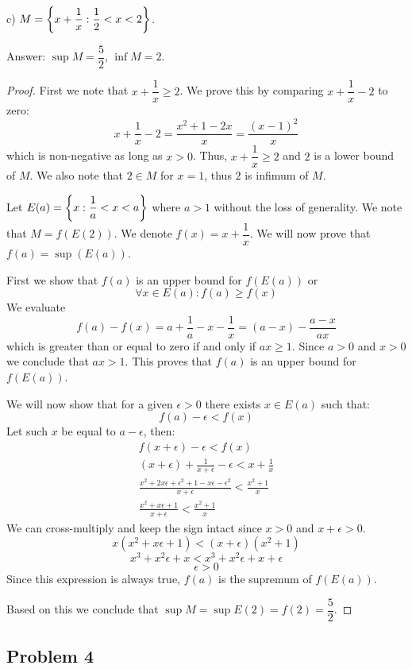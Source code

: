 \documentclass{article}
\DeclarePairedDelimiter{\set}{ \{ }{ \} }
\begin{document}
\begin{tcolorbox}
c) $M = \set*{ x + \dfrac{1}{x} : \dfrac{1}{2} < x < 2 }$.
\end{tcolorbox}

Answer: $\sup M = \dfrac{5}{2}$, $\inf M = 2$.

\begin{proof}
First we note that $x+\dfrac{1}{x} \geq 2$.
We prove this by comparing $x+\dfrac{1}{x}-2$ to zero:
\[ x+\frac{1}{x}-2 = \frac{x^2+1-2x}{x} = \frac{(x-1)^2}{x} \]
which is non-negative as long as $x>0$.
Thus, $x+\dfrac{1}{x} \geq 2$ and $2$ is a lower bound of $M$.
We also note that $2 \in M$ for $x=1$, thus $2$ is infimum of $M$.

Let $E(a) = \set*{ x : \dfrac{1}{a} < x < a }$ where $a>1$ without the loss of generality. We note that $M = f(E(2))$.
We denote $f(x) = x+\dfrac{1}{x}$.
We will now prove that $f(a) = \sup(E(a))$.

First we show that $f(a)$ is an upper bound for $f(E(a))$ or
\[ \forall x \in E(a): f(a) \geq f(x) \]
We evaluate
\[ f(a)-f(x) = a+\frac{1}{a} - x - \frac{1}{x} = (a-x) - \frac{a-x}{ax} \]
which is greater than or equal to zero if and only if $ax \geq 1$.
Since $a>0$ and $x>0$ we conclude that $ax > 1$.
This proves that $f(a)$ is an upper bound for $f(E(a))$.

We will now show that for a given $\epsilon>0$ there exists $x \in E(a)$ such that:
\[ f(a) - \epsilon < f(x) \]
Let such $x$ be equal to $a - \epsilon$, then:
\begin{gather*}
    f(x+\epsilon) - \epsilon < f(x) \\
    (x+\epsilon) + \frac{1}{x+\epsilon} - \epsilon < x + \frac{1}{x} \\
    \frac{x^2 + 2x \epsilon + \epsilon^2+1 - x \epsilon - \epsilon^2}{x+\epsilon} < \frac{x^2+1}{x} \\
    \frac{x^2+x\epsilon+1}{x+\epsilon} < \frac{x^2+1}{x}    
\end{gather*}
We can cross-multiply and keep the sign intact since $x>0$ and $x+\epsilon>0$.
$$ x(x^2+x\epsilon+1) < (x+\epsilon)(x^2+1)$$
$$ x^3+x^2\epsilon+x < x^3+x^2\epsilon+x+\epsilon$$
$$ \epsilon > 0$$
Since this expression is always true, $f(a)$ is the supremum of $f(E(a))$.

Based on this we conclude that $\sup M = \sup E(2) = f(2) = \dfrac{5}{2}$.

\end{proof}


\subsection*{Problem 4}
\end{document}
